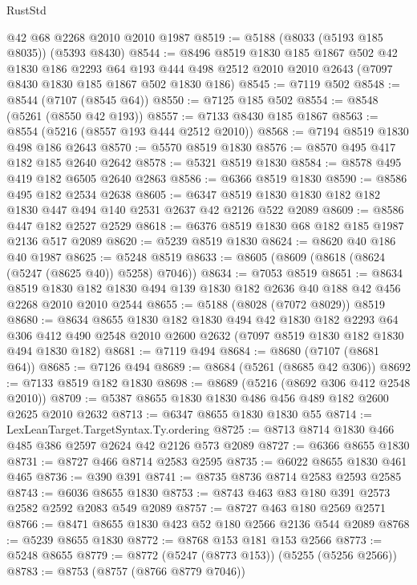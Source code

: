 \begin{lexlean}{RustStd}
\begin{coremodule}
    @42
    @68
    @2268
    @2010
    @2010
    @1987
@8519 := @5188 (@8033 (@5193 @185 @8035)) (@5393 @8430)
@8544 := @8496
    @8519
    @1830
    @185
    @1867
    @502
    @42
    @1830
    @186
    @2293
    @64
    @193
    @444
    @498
    @2512
    @2010
    @2010
    @2643
    (@7097 @8430 @1830 @185 @1867 @502 @1830 @186)
@8545 := @7119 @502
@8548 := @8544 (@7107 (@8545 @64))
@8550 := @7125 @185 @502
@8554 := @8548 (@5261 (@8550 @42 @193))
@8557 := @7133 @8430 @185 @1867
@8563 := @8554 (@5216 (@8557 @193 @444 @2512 @2010))
@8568 := @7194 @8519 @1830 @498 @186 @2643
@8570 := @5570 @8519 @1830
@8576 := @8570 @495 @417 @182 @185 @2640 @2642
@8578 := @5321 @8519 @1830
@8584 := @8578 @495 @419 @182 @6505 @2640 @2863
@8586 := @6366 @8519 @1830
@8590 := @8586 @495 @182 @2534 @2638
@8605 := @6347 @8519 @1830 @1830 @182 @182 @1830 @447 @494 @140 @2531 @2637 @42 @2126 @522 @2089
@8609 := @8586 @447 @182 @2527 @2529
@8618 := @6376 @8519 @1830 @68 @182 @185 @1987 @2136 @517 @2089
@8620 := @5239 @8519 @1830
@8624 := @8620 @40 @186 @40 @1987
@8625 := @5248 @8519
@8633 := @8605 (@8609 (@8618 (@8624 (@5247 (@8625 @40)) @5258) @7046))
@8634 := @7053 @8519
@8651 := @8634
    @8519
    @1830
    @182
    @1830
    @494
    @139
    @1830
    @182
    @2636
    @40
    @188
    @42
    @456
    @2268
    @2010
    @2010
    @2544
@8655 := @5188 (@8028 (@7072 @8029)) @8519
@8680 := @8634
    @8655
    @1830
    @182
    @1830
    @494
    @42
    @1830
    @182
    @2293
    @64
    @306
    @412
    @490
    @2548
    @2010
    @2600
    @2632
    (@7097 @8519 @1830 @182 @1830 @494 @1830 @182)
@8681 := @7119 @494
@8684 := @8680 (@7107 (@8681 @64))
@8685 := @7126 @494
@8689 := @8684 (@5261 (@8685 @42 @306))
@8692 := @7133 @8519 @182 @1830
@8698 := @8689 (@5216 (@8692 @306 @412 @2548 @2010))
@8709 := @5387 @8655 @1830 @1830 @486 @456 @489 @182 @2600 @2625 @2010 @2632
@8713 := @6347 @8655 @1830 @1830 @55
@8714 := LexLeanTarget.TargetSyntax.Ty.ordering
@8725 := @8713 @8714 @1830 @466 @485 @386 @2597 @2624 @42 @2126 @573 @2089
@8727 := @6366 @8655 @1830
@8731 := @8727 @466 @8714 @2583 @2595
@8735 := @6022 @8655 @1830 @461 @465
@8736 := @390 @391
@8741 := @8735 @8736 @8714 @2583 @2593 @2585
@8743 := @6036 @8655 @1830
@8753 := @8743 @463 @83 @180 @391 @2573 @2582 @2592 @2083 @549 @2089
@8757 := @8727 @463 @180 @2569 @2571
@8766 := @8471 @8655 @1830 @423 @52 @180 @2566 @2136 @544 @2089
@8768 := @5239 @8655 @1830
@8772 := @8768 @153 @181 @153 @2566
@8773 := @5248 @8655
@8779 := @8772 (@5247 (@8773 @153)) (@5255 (@5256 @2566))
@8783 := @8753 (@8757 (@8766 @8779 @7046))

\end{coremodule}
\end{lexlean}

